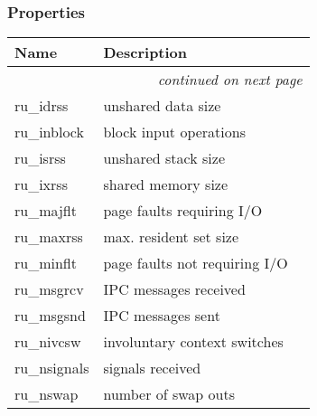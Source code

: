 
  \subsubsection{Properties}

    \vspace{-1cm}
\hspace{\varindent}\begin{longtable}{|p{\varnamewidth}|p{\vardescrwidth}|l}
\cline{1-2}
\cline{1-2} \centering \textbf{Name} & \centering \textbf{Description}& \\
\cline{1-2}
\endhead\cline{1-2}\multicolumn{3}{r}{\small\textit{continued on next page}}\\\endfoot\cline{1-2}
\endlastfoot\raggedright r\-u\-\_\-i\-d\-r\-s\-s\- & \raggedright unshared data size&\\
\cline{1-2}
\raggedright r\-u\-\_\-i\-n\-b\-l\-o\-c\-k\- & \raggedright block input operations&\\
\cline{1-2}
\raggedright r\-u\-\_\-i\-s\-r\-s\-s\- & \raggedright unshared stack size&\\
\cline{1-2}
\raggedright r\-u\-\_\-i\-x\-r\-s\-s\- & \raggedright shared memory size&\\
\cline{1-2}
\raggedright r\-u\-\_\-m\-a\-j\-f\-l\-t\- & \raggedright page faults requiring I/O&\\
\cline{1-2}
\raggedright r\-u\-\_\-m\-a\-x\-r\-s\-s\- & \raggedright max. resident set size&\\
\cline{1-2}
\raggedright r\-u\-\_\-m\-i\-n\-f\-l\-t\- & \raggedright page faults not requiring I/O&\\
\cline{1-2}
\raggedright r\-u\-\_\-m\-s\-g\-r\-c\-v\- & \raggedright IPC messages received&\\
\cline{1-2}
\raggedright r\-u\-\_\-m\-s\-g\-s\-n\-d\- & \raggedright IPC messages sent&\\
\cline{1-2}
\raggedright r\-u\-\_\-n\-i\-v\-c\-s\-w\- & \raggedright involuntary context switches&\\
\cline{1-2}
\raggedright r\-u\-\_\-n\-s\-i\-g\-n\-a\-l\-s\- & \raggedright signals received&\\
\cline{1-2}
\raggedright r\-u\-\_\-n\-s\-w\-a\-p\- & \raggedright number of swap outs&\\
\cline{1-2}

\end{longtable}
